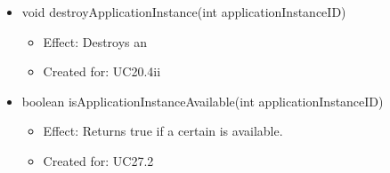 \begin{description}
\begin{itemize}[noitemsep,nolistsep,leftmargin=-.25cm]
\begin{itemize}
        \end{itemize}
      \item \textsf{void destroyApplicationInstance(int applicationInstanceID)}
        \begin{itemize}[noitemsep,nolistsep]
           \item Effect: Destroys an 
\item Created for: UC20.4ii
        \end{itemize}
      \item \textsf{boolean isApplicationInstanceAvailable(int applicationInstanceID)}
        \begin{itemize}[noitemsep,nolistsep]
           \item Effect: Returns true if a certain  is available.
\item Created for: UC27.2
        \end{itemize}
    \end{itemize}
    \end{description}

